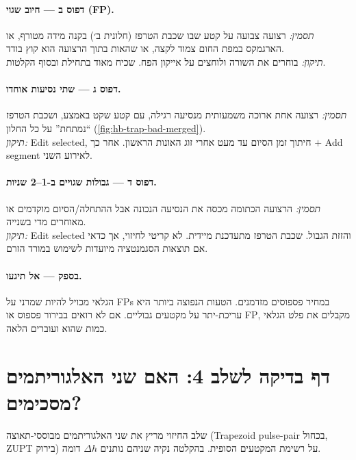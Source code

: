 \documentclass[11pt,a4paper]{article}
\begin{document}
\paragraph{דפוס ב --- חיוב שגוי (\textenglish{FP}).}
\textit{תסמין:} רצועה צבועה על קטע שבו שכבת הטרפז (חלונית ב׳)
בקנה מידה מטורף, או הארגמקס במפת החום צמוד לקצה, או שהאות בתוך
הרצועה הוא קוץ בודד.\\
\textit{תיקון:} בוחרים את השורה ולוחצים על אייקון הפח. שכיח מאוד
בתחילת ובסוף הקלטות.

\paragraph{דפוס ג --- שתי נסיעות אוחדו.}
\textit{תסמין:} רצועה אחת ארוכה משמעותית מנסיעה רגילה, עם קטע שקט
באמצע, ושכבת הטרפז ``נמתחת'' על כל החלון
(\autoref{fig:hb-trap-bad-merged}).\\
\textit{תיקון:} \textenglish{Edit selected}, חיתוך זמן הסיום עד
מעט אחרי זוג האונות הראשון. אחר כך \textenglish{$+$ Add segment}
לאירוע השני.

\paragraph{דפוס ד --- גבולות שגויים ב-1--2 שניות.}
\textit{תסמין:} הרצועה הכתומה מכסה את הנסיעה הנכונה אבל
ההתחלה/הסיום מוקדמים או מאוחרים מדי בשנייה.\\
\textit{תיקון:} \textenglish{Edit selected} והזזת הגבול. שכבת
הטרפז מתעדכנת מיידית. לא קריטי לחיזוי, אך כדאי אם תוצאות
הסגמנטציה מיועדות לשימוש במורד הזרם.

\paragraph{בספק --- אל תיגעו.} הגלאי מכויל להיות שמרני על
\textenglish{FPs} במחיר פספוסים מזדמנים. הטעות הנפוצה ביותר היא
עריכת-יתר על מקטעים גבוליים. אם לא רואים בבירור פספוס או
\textenglish{FP}, מקבלים את פלט הגלאי כמות שהוא ועוברים הלאה.

\section{דף בדיקה לשלב 4: האם שני האלגוריתמים מסכימים?}
\label{sec:heb-step4-cheat}

שלב החיזוי מריץ את שני האלגוריתמים מבוססי-תאוצה
(\textenglish{Trapezoid pulse-pair} בכחול, \textenglish{ZUPT}
בירוק) על רשימת המקטעים הסופית. בהקלטה נקיה שניהם נותנים $\Delta h$
דומה.
\end{document}
